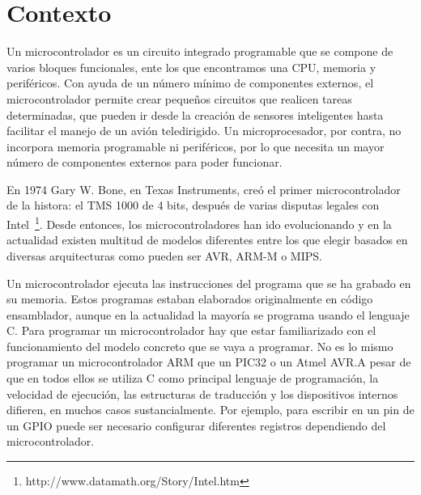 

\section{Contexto} %
%
\label{sec:Contexto}
Un microcontrolador es un circuito integrado programable que se compone de varios bloques funcionales, ente los que encontramos una CPU, memoria y periféricos. Con ayuda de un número mínimo de componentes externos, el microcontrolador permite crear pequeños circuitos que realicen tareas determinadas, que pueden ir desde la creación de sensores inteligentes hasta facilitar el manejo de un avión teledirigido. Un microprocesador, por contra, no incorpora memoria programable ni periféricos, por lo que necesita un mayor número de componentes externos para poder funcionar.


En 1974 Gary W. Bone, en Texas Instruments, creó el primer microcontrolador de la histora: el TMS 1000 de 4 bits, después de varias disputas legales con Intel~\footnote{http://www.datamath.org/Story/Intel.htm}. Desde entonces, los microcontroladores han ido evolucionando y en la actualidad existen multitud de modelos diferentes entre los que elegir basados en diversas arquitecturas como pueden ser AVR, ARM-M o MIPS. 

Un microcontrolador ejecuta las instrucciones del programa que se ha grabado en su memoria. Estos programas estaban elaborados originalmente en código ensamblador, aunque en la actualidad la mayoría se programa usando el lenguaje C. Para programar un microcontrolador hay que estar familiarizado con el funcionamiento del modelo concreto que se vaya a programar. No es lo mismo programar un microcontrolador ARM que un PIC32 o un Atmel AVR.\@ A pesar de que en todos ellos se utiliza C como principal lenguaje de programación, la velocidad de ejecución, las estructuras de traducción y los dispositivos internos difieren, en muchos casos sustancialmente. Por ejemplo, para escribir en un pin de un GPIO puede ser necesario configurar diferentes registros dependiendo del microcontrolador.

